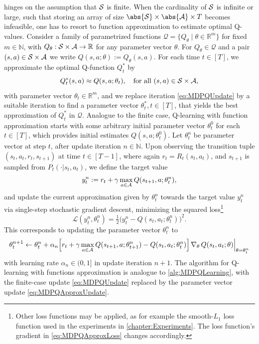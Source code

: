\documentclass[
    a4paper,
    11pt,
    bibliography=totoc,
    listof=totoc,      
    headinclude=true,
    cleardoublepage=empty,
]{scrbook}
\theoremstyle{plain}
\theoremstyle{definition}
\theoremstyle{remark}
\newcommand{\SetR}{\mathbb R}
\newcommand{\SetN}{\mathbb N}
\newcommand{\SpaceS}{{\cal S}}
\newcommand{\SpaceA}{{\cal A}}
\begin{document}
 hinges on the assumption that $\SpaceS$ is finite.
When the cardinality of $\SpaceS$ is infinite or large, such that storing an
array of size $\abs{\SpaceS}\times\abs{\SpaceA}\times{T}$ becomes infeasible, 
one has to resort to function approximation to estimate optimal Q-values. 
Consider a family of parametrized functions $\mathcal{Q} = 
\{Q_\theta \mid \theta \in \SetR^m\}$ for fixed $m\in\SetN$, with $Q_\theta:
\SpaceS \times \SpaceA \to \SetR$ for any parameter vector $\theta$. For 
$Q_\theta \in \mathcal{Q}$ and a pair $(s,a)\in\SpaceS\times\SpaceA$ we write 
$Q(s,a;\theta) := Q_{\theta}(s,a)$. For each time $t\in[T]$, we approximate 
the optimal Q-function $Q^*_t$ by
\begin{equation}
\label{eq:MDPQApprox}
    Q^*_t(s,a) \approx Q(s,a;\theta_t), 
    \quad \text{for all } (s,a)\in\SpaceS\times\SpaceA,
\end{equation}
with parameter vector $\theta_t \in \SetR^m$, and we replace iteration 
\eqref{eq:MDPQUpdate} by a suitable iteration to find a parameter vector 
$\theta^*_t, t\in[T]$, that yields the best approximation of $Q_t^*$ in 
$\mathcal{Q}$. Analogue to the finite case, Q-learning with function 
approximation starts with some arbitrary initial
parameter vector $\theta^0_t$ for each $t\in[T]$, which provides initial
estimates $Q(s,a;\theta^0_t)$. Let $\theta^n_t$ be parameter vector at step 
$t$, after update iteration $n\in\SetN$.
Upon observing the transition tuple $(s_t,a_t,r_t,s_{t+1})$ at time $t\in 
[T-1]$, where again $r_t=R_t(s_t,a_t)$, and $s_{t+1}$ is sampled from 
$P_t(\cdot|s_t,a_t)$, we define the target value
\begin{equation}
\label{eq:MDPQApproxTarget}
    y^n_t 
    := r_t 
        + \gamma \max_{a\in\SpaceA} Q(s_{t+1},a;\theta^n_t),
\end{equation}
and update the current approximation given by $\theta^n_t$ towards the target 
value $y_t^n$ via single-step stochastic gradient descent, minimizing the 
squared loss\footnote{
    Other loss functions may be applied, as for example the smooth-$L_1$ loss
    function used in the experiments in \cref{chapter:Experiments}. The loss 
    function's gradient in \eqref{eq:MDPQApproxLoss} changes accordingly.
}
\begin{equation}
\label{eq:MDPQApproxLoss}
    \mathcal{L}(y_t^n, \theta^n_t) 
    = \tfrac{1}{2}\bigl(y^n_t - Q(s_t,a_t;\theta^n_t)\bigr)^2.
\end{equation}
This corresponds to updating the parameter vector $\theta_t^n$ to 
\begin{equation}
\label{eq:MDPQApproxUpdate}
    \theta^{n+1}_t 
    \gets \theta^n_t + \alpha_n
        \Bigl[
            r_t + \gamma \max_{a\in\SpaceA} Q(s_{t+1},a;\theta^n_{t+1})
            - Q(s_t,a_t;\theta^n_t)
        \Bigr]\, \nabla_{\theta}\, Q(s_t,a_t;\theta){\Big|}_{\theta=\theta_t^n}
\end{equation}
with learning rate $\alpha_n\in(0,1]$ in update iteration $n+1$. The algorithm 
for Q-learning with functions approximation is analogue to 
\cref{alg:MDPQLearning}, with the finite-case update \eqref{eq:MDPQUpdate} 
replaced by the parameter vector update \eqref{eq:MDPQApproxUpdate}.
\end{document}
